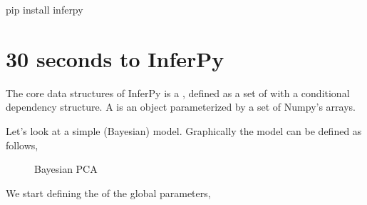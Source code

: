 \documentclass[letterpaper,10pt,english]{sphinxmanual}
\begin{document}
\begin{sphinxVerbatim}[commandchars=\\\{\}]
\PYGZdl{} pip install inferpy
\end{sphinxVerbatim}


\section{30 seconds to InferPy}
\label{\detokenize{notes/getting30s:seconds-to-inferpy}}
The core data structures of InferPy is a ,
defined as a set of  with a conditional dependency
structure. A  is an object
parameterized by a set of Numpy’s arrays.

Let’s look at a simple (Bayesian)  model. Graphically the model can
be defined as follows,

\begin{figure}[htbp]
\centering
\capstart

\noindent{}
\caption{Bayesian PCA}\label{\detokenize{notes/getting30s:id1}}\end{figure}

We start defining the  of the global parameters,

\begin{sphinxVerbatim}[commandchars=\\\{\}]
   
   



   
                

\end{sphinxVerbatim}
\end{document}
